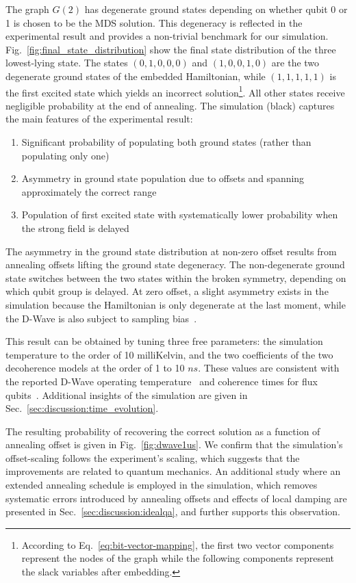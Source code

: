 \documentclass[10pt]{iopart}
\begin{document}
The graph $G(2)$ has degenerate ground states depending on whether qubit 0 or 1 is chosen to be the MDS solution.
This degeneracy is reflected in the experimental result and provides a non-trivial benchmark for our simulation.
Fig.~\ref{fig:final_state_distribution} show the final state distribution of the three lowest-lying state.
The states $(0, 1, 0, 0, 0)$ and $(1, 0, 0, 1, 0)$ are the two degenerate ground states of the embedded Hamiltonian, while $(1, 1, 1, 1, 1)$ is the first excited state which yields an incorrect solution\footnote{According to Eq.~\eqref{eq:bit-vector-mapping}, the first two vector components represent the nodes of the graph while the following components represent the slack variables after embedding.}.
All other states receive negligible probability at the end of annealing.
The simulation (black) captures the main features of the experimental result:
\begin{enumerate}
    \item Significant probability of populating both ground states (rather than populating only one)
    \item Asymmetry in ground state population due to offsets and spanning approximately the correct range
    \item Population of first excited state with systematically lower probability when the strong field is delayed
\end{enumerate}
The asymmetry in the ground state distribution at non-zero offset results from annealing offsets lifting the ground state degeneracy.
The non-degenerate ground state switches between the two states within the broken symmetry, depending on which qubit group is delayed. At zero offset, a slight asymmetry exists in the simulation because the Hamiltonian is only degenerate at the last moment, while the D-Wave is also subject to sampling bias~\cite{2016PhRvA..93e2320K, 2017PhRvL.118g0502M}.

This result can be obtained by tuning three free parameters: the simulation temperature to the order of 10 milliKelvin, and the two coefficients of the two decoherence models at the order of 1 to 10 $ns$. These values are consistent with the reported D-Wave operating temperature~\cite{dwave_temp} and coherence times for flux qubits~\cite{2003Sci...299.1869C}.
Additional insights of the simulation are given in Sec.~\ref{sec:discussion:time_evolution}.

The resulting probability of recovering the correct solution as a function of annealing offset is given in Fig.~\ref{fig:dwave1us}.
We confirm that the simulation's offset-scaling follows the experiment's scaling, which suggests that the improvements are related to quantum mechanics.
An additional study where an extended annealing schedule is employed in the simulation, which removes systematic errors introduced by annealing offsets and effects of local damping are presented in Sec.~\ref{sec:discussion:idealqa}, and further supports this observation.
\end{document}
